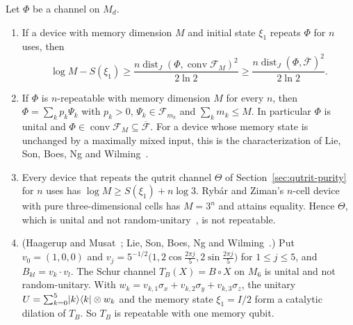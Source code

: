 \begin{proposition}\label{prop:repeatable}
Let $\Phi$ be a channel on $M_d$.
\begin{enumerate}[label=(\alph*),itemsep=1pt]
\item If a device with memory dimension $M$ and initial state $\xi_1$
repeats $\Phi$ for $n$ uses, then
\[
 \log M-S(\xi_1)\geq
 \frac{n\operatorname{dist}_J(\Phi,\operatorname{conv}\mathcal F_M)^2}{2\ln2}
 \geq\frac{n\operatorname{dist}_J(\Phi,\overline{\mathcal F})^2}{2\ln2}.
\]
\item If $\Phi$ is $n$-repeatable with memory dimension $M$ for every
$n$, then $\Phi=\sum_kp_k\Psi_k$ with $p_k>0$,
$\Psi_k\in\mathcal F_{m_k}$ and $\sum_km_k\leq M$. In particular $\Phi$
is unital and $\Phi\in\operatorname{conv}\mathcal F_M\subseteq\overline{\mathcal F}$.
For a device whose memory state is unchanged by a maximally mixed
input, this is the characterization of Lie, Son, Boes, Ng and
Wilming~\cite[Proposition~4 and Equation~(14)]{LieSonBoesNgWilming2026}.
\item Every device that repeats the qutrit channel $\Theta$ of
Section~\ref{sec:qutrit-purity} for $n$ uses has
$\log M\geq S(\xi_1)+n\log3$. Ryb\'ar and Ziman's $n$-cell
device~\cite[Section~III]{RybarZiman2008} with pure three-dimensional
cells has $M=3^n$ and attains equality. Hence $\Theta$, which is unital
and not random-unitary~\cite{LandauStreater1993}, is not repeatable.
\item (Haagerup and Musat~\cite[Example~3.3]{HaagerupMusat2011}; Lie,
Son, Boes, Ng and Wilming~\cite[Proposition~15]{LieSonBoesNgWilming2026}.)
Put $v_0=(1,0,0)$ and
$v_j=5^{-1/2}\bigl(1,2\cos\frac{2\pi j}{5},2\sin\frac{2\pi j}{5}\bigr)$
for $1\leq j\leq5$, and $B_{kl}=v_k\cdot v_l$. The Schur channel
$T_B(X)=B\circ X$ on $M_6$ is unital and not random-unitary. With
$w_k=v_{k,1}\sigma_x+v_{k,2}\sigma_y+v_{k,3}\sigma_z$, the unitary
$U=\sum_{k=0}^5\lvert k\rangle\langle k\rvert\otimes w_k$ and the memory state
$\xi_1=I/2$ form a catalytic dilation of $T_B$. So $T_B$ is repeatable
with one memory qubit.
\end{enumerate}
\end{proposition}

